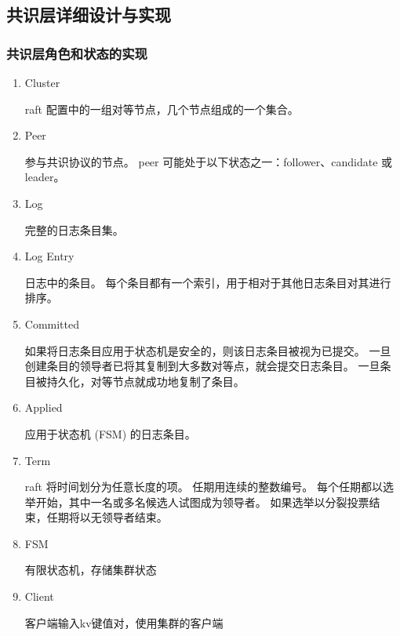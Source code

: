     \subsection{共识层详细设计与实现}
		\subsubsection{共识层角色和状态的实现}
			\begin{enumerate}
				\item Cluster 
				 
					raft 配置中的一组对等节点，几个节点组成的一个集合。

				\item Peer
				
					参与共识协议的节点。 peer 可能处于以下状态之一：follower、candidate 或 leader。

				\item Log
					
					完整的日志条目集。
				\item Log Entry 
				
					日志中的条目。 每个条目都有一个索引，用于相对于其他日志条目对其进行排序。
				\item Committed 
				
					如果将日志条目应用于状态机是安全的，则该日志条目被视为已提交。 
					一旦创建条目的领导者已将其复制到大多数对等点，就会提交日志条目。 
					一旦条目被持久化，对等节点就成功地复制了条目。
				\item Applied 
					
					应用于状态机 (FSM) 的日志条目。
				\item Term 

					raft 将时间划分为任意长度的项。 
					任期用连续的整数编号。 
					每个任期都以选举开始，其中一名或多名候选人试图成为领导者。 
					如果选举以分裂投票结束，任期将以无领导者结束。
				\item FSM 
					
					有限状态机，存储集群状态
				\item Client

					客户端输入kv键值对，使用集群的客户端
			\end{enumerate}

		
